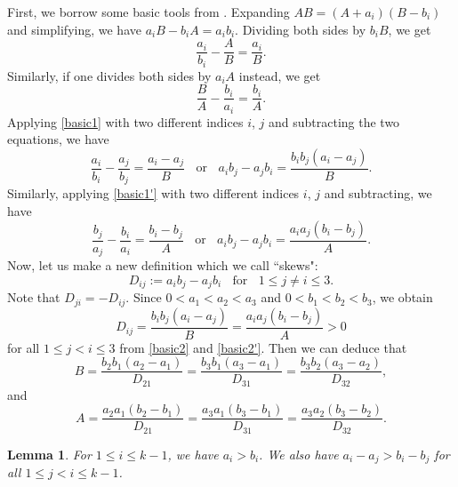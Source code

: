 \documentclass[12pt]{article}
\newtheorem{lem}{Lemma}
\begin{document}
First, we borrow some basic tools from \cite{C1}. Expanding $A B = (A + a_i) (B - b_i)$ and simplifying, we have $a_i B - b_i A = a_i b_i$. Dividing both sides by $b_i B$, we get
\begin{equation} \label{basic1}
\frac{a_i}{b_i} - \frac{A}{B} = \frac{a_i}{B}.
\end{equation}
Similarly, if one divides both sides by $a_i A$ instead, we get
\begin{equation} \label{basic1'}
\frac{B}{A} - \frac{b_i}{a_i} = \frac{b_i}{A}.
\end{equation}
Applying \eqref{basic1} with two different indices $i$, $j$ and subtracting the two equations, we have
\begin{equation} \label{basic2}
\frac{a_i}{b_i} - \frac{a_j}{b_j} = \frac{a_i - a_j}{B} \; \; \text{ or } \; \; a_i b_j - a_j b_i = \frac{b_i b_j (a_i - a_j)}{B}.
\end{equation}
Similarly, applying \eqref{basic1'} with two different indices $i$, $j$ and subtracting, we have
\begin{equation} \label{basic2'}
\frac{b_j}{a_j} - \frac{b_i}{a_i} = \frac{b_i - b_j}{A} \; \; \text{ or } \; \; a_i b_j - a_j b_i = \frac{a_i a_j (b_i - b_j)}{A}.
\end{equation}
Now, let us make a new definition which we call ``skews": 
\begin{equation} \label{disc}
D_{i j} := a_i b_j - a_j b_i  \; \; \text{ for } \; \; 1 \le j \neq i \le 3.
\end{equation}
Note that $D_{j i} = - D_{i j}$. Since $0 < a_1 < a_2 < a_3$ and $0 < b_1 <  b_2 < b_3$, we obtain
\[
D_{i j} = \frac{b_i b_j (a_i - a_j)}{B} = \frac{a_i a_j (b_i - b_j)}{A} > 0
\]
for all $1 \le j < i \le 3$ from \eqref{basic2} and \eqref{basic2'}. Then we can deduce that
\begin{equation} \label{basic3}
B = \frac{b_2 b_1 (a_2 - a_1)}{D_{21}} = \frac{b_3 b_1 (a_3 - a_1)}{D_{31}} = \frac{b_3 b_2 (a_3 - a_2)}{D_{32}},
\end{equation}
and
\begin{equation} \label{basic3'}
A = \frac{a_2 a_1 (b_2 - b_1)}{D_{21}} = \frac{a_3 a_1 (b_3 - b_1)}{D_{31}} = \frac{a_3 a_2 (b_3 - b_2)}{D_{32}}.
\end{equation}
\begin{lem} \label{lem1}
For $1 \le i \le k-1$, we have $a_i > b_i$. We also have $a_i - a_j > b_i - b_j$ for all $1 \le j < i \le k-1$.
\end{lem}
\end{document}
